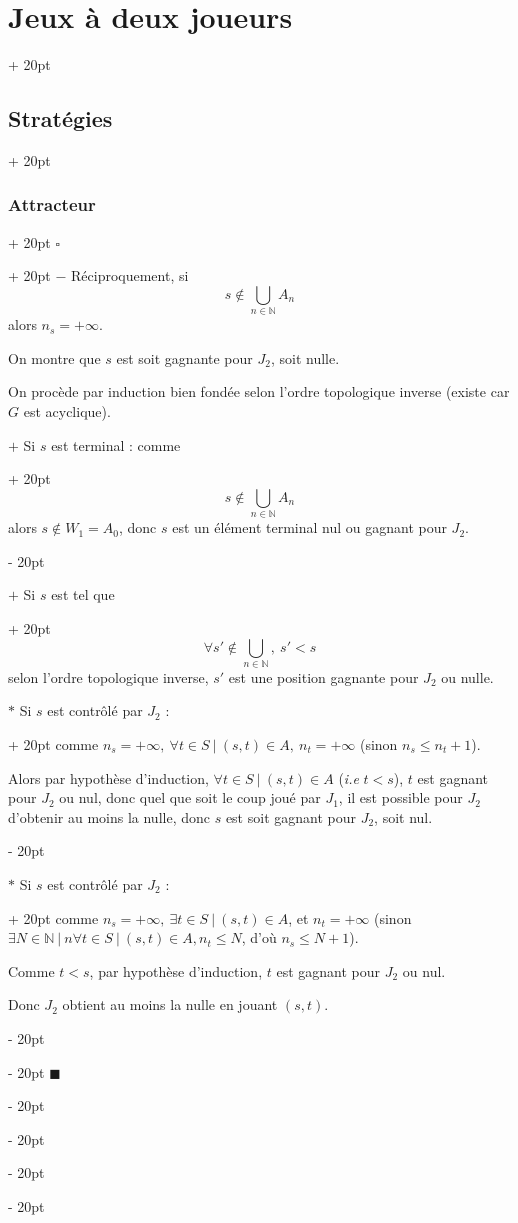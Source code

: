 \documentclass[a4paper, 12pt, twoside]{article}
\newcommand{\N}{\mathbb{N}} %
\renewcommand{\le}{\leqslant}
\newcommand{\ind}[1][20pt]{\advance\leftskip + #1}
\newcommand{\deind}[1][20pt]{\advance\leftskip - #1}
\newenvironment{indt}[2][20pt]{#2 \par \ind[#1]}{\par \deind} %
\newenvironment{proof}[1][{}]{\begin{indt}{$\square$ #1}}{$\blacksquare$ \end{indt}}
\begin{document}
\begin{indt}{\section{Jeux à deux joueurs}}
\begin{indt}{\subsection{Stratégies}}
\begin{indt}{\subsubsection{Attracteur}}
\begin{proof}
                    $-$ Réciproquement, si
                    \[
                        s \notin \bigcup_{n \in \N} A_n
                    \]
                    alors $n_s = +\infty$.

                    On montre que $s$ est soit gagnante pour $J_2$, soit nulle.

                    On procède par induction bien fondée selon l'ordre topologique inverse (existe car $G$ est acyclique).

                    \begin{indt}{$+$ Si $s$ est terminal : comme}
                        \[
                            s \notin \bigcup_{n \in \N} A_n
                        \]
                        alors $s \notin W_1 = A_0$, donc $s$ est un élément terminal nul ou gagnant pour $J_2$.
                    \end{indt}

                    \begin{indt}{$+$ Si $s$ est tel que}
                        \[
                            \forall s' \notin \bigcup_{n \in \N},\ s' < s
                        \]
                        selon l'ordre topologique inverse, $s'$ est une position gagnante pour $J_2$ ou nulle.

                        \begin{indt}{$*$ Si $s$ est contrôlé par $J_2$ :}
                            comme $n_s = +\infty,\ \forall t \in S\ |\ (s, t) \in A,\ n_t = +\infty$ (sinon $n_s \le n_t + 1$).

                            Alors par hypothèse d'induction, $\forall t \in S\ |\ (s, t) \in A$ (\textit{i.e} $t < s$), $t$ est gagnant pour $J_2$ ou nul, donc quel que soit le coup joué par $J_1$, il est possible pour $J_2$ d'obtenir au moins la nulle, donc $s$ est soit gagnant pour $J_2$, soit nul.
                        \end{indt}

                        \begin{indt}{$*$ Si $s$ est contrôlé par $J_2$ :}
                            comme $n_s = +\infty,\ \exists t \in S\ |\ (s, t) \in A$, et $n_t = +\infty$ (sinon $\exists N \in \N\ |\ n\forall t \in S\ |\ (s, t) \in A, n_t \le N$, d'où $n_s \le N + 1$).

                            Comme $t < s$, par hypothèse d'induction, $t$ est gagnant pour $J_2$ ou nul.

                            Donc $J_2$ obtient au moins la nulle en jouant $(s, t)$.


\end{indt}
\end{indt}
\end{proof}
\end{indt}
\end{indt}
\end{indt}
\end{document}
